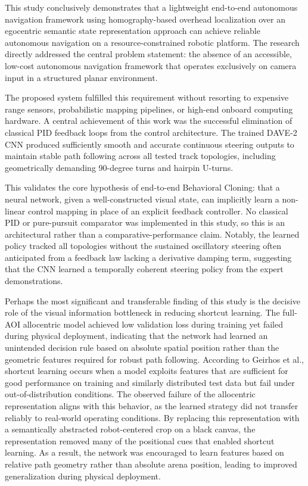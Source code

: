 This study conclusively demonstrates that a lightweight end-to-end autonomous navigation framework using homography-based overhead localization over an egocentric semantic state representation approach can achieve reliable autonomous navigation on a resource-constrained robotic platform. The research directly addressed the central problem statement: the absence of an accessible, low-cost autonomous navigation framework that operates exclusively on camera input in a structured planar environment.

The proposed system fulfilled this requirement without resorting to expensive range sensors, probabilistic mapping pipelines, or high-end onboard computing hardware. A central achievement of this work was the successful elimination of classical PID feedback loops from the control architecture. The trained DAVE-2 CNN produced sufficiently smooth and accurate continuous steering outputs to maintain stable path following across all tested track topologies, including geometrically demanding 90-degree turns and hairpin U-turns.

This validates the core hypothesis of end-to-end Behavioral Cloning: that a neural network, given a well-constructed visual state, can implicitly learn a non-linear control mapping in place of an explicit feedback controller. No classical PID or pure-pursuit comparator was implemented in this study, so this is an architectural rather than a comparative-performance claim. Notably, the learned policy tracked all topologies without the sustained oscillatory steering often anticipated from a feedback law lacking a derivative damping term, suggesting that the CNN learned a temporally coherent steering policy from the expert demonstrations.

Perhaps the most significant and transferable finding of this study is the decisive role of the visual information bottleneck in reducing shortcut learning. The full-AOI allocentric model achieved low validation loss during training yet failed during physical deployment, indicating that the network had learned an unintended decision rule based on absolute spatial position rather than the geometric features required for robust path following. According to Geirhos et al., shortcut learning occurs when a model exploits features that are sufficient for good performance on training and similarly distributed test data but fail under out-of-distribution conditions. The observed failure of the allocentric representation aligns with this behavior, as the learned strategy did not transfer reliably to real-world operating conditions. By replacing this representation with a semantically abstracted robot-centered crop on a black canvas, the representation removed many of the positional cues that enabled shortcut learning. As a result, the network was encouraged to learn features based on relative path geometry rather than absolute arena position, leading to improved generalization during physical deployment\cite{geirhos2020shortcut}.


